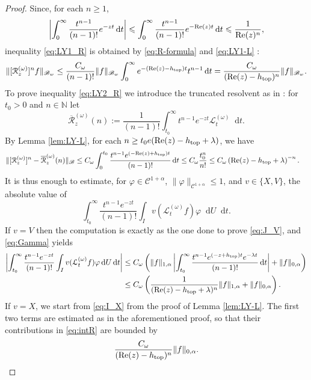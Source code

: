 \documentclass[11pt,letterpaper]{amsart}
\newcommand \cL {{\mathcal L}}
\newcommand \cR {{\mathcal R}}
\newcommand \N {{ \mathbb N}}
\newcommand \cB {{\mathscr B}}
\newcommand \cC {{\mathscr{C}}}
\newcommand*{\diff}{\mathop{}\!\mathrm{d}}
\newcommand \re {{%
\operatorname{Re}
}}
\DeclareMathOperator{\topp}{top}
\theoremstyle{definition}
\begin{document}
\begin{proof}
Since, for each $n \ge 1$,
\begin{equation}\label{eq:Gamma}
\left|\int_0^{\infty} \frac{t^{n-1}}{(n-1) !} e^{-z t} \diff t\right| \leqslant \int_0^{\infty} \frac{t^{n-1}}{(n-1) !} e^{-\re(z) t} \diff t \leqslant \frac{1}{\re(z)^{n}},
\end{equation}
inequality \eqref{eq:LY1_R} is obtained by \eqref{eq:R-formula} and \eqref{eq:LY1-L} :
\[
\|[\cR_z^{(\omega)}]^n f\|_{\cB_w} \leq \frac{C_\omega}{(n-1) !}\|f\|_{\cB_w} \int_0^{\infty}  e^{-(\re(z)-h_{\topp})t} t^{n-1}\diff t=\frac{C_\omega}{(\re(z)-h_{\topp})^n} \|f\|_{\cB_w}.
\]
To prove inequality \eqref{eq:LY2_R} we introduce the truncated resolvent as in \cite{GiLiPo}: for $t_0>0$ and $n\in \N$ let
\[
\overline\cR_z^{(\omega)}(n):=\frac{1}{(n-1) !} \int_{t_0}^{\infty} t^{n-1} e^{-z t} \mathcal{L}_t^{(\omega)}\diff t.
\]
By Lemma \ref{lem:LY-L}, for each $n \ge t_0 e (\re(z)-h_{\topp}+\lambda)$, we have
\[
\begin{split}
\|[\cR_z^{(\omega)}]^n-\overline\cR_z^{(\omega)}(n)\|_{\cB}& \leq C_\omega\int_0^{t_0} \frac{ t^{n-1} e^{(-\re(z)+h_{\topp}) t}}{(n-1) !} \diff t\leq C_\omega \frac{t_0^n}{n !} \leq C_\omega\left(\re(z)-h_{\topp}+\lambda \right)^{-n}.
\end{split}
\]
It is thus enough to estimate, for $\varphi\in \cC^{1+\alpha}$, $\|\varphi\|_{\cC^{1+\alpha}}\le 1$, and $v\in \{X,V\}$, the absolute value of
\begin{equation}\label{eq:intR}
\int_{t_0}^{\infty} \frac{ t^{n-1} e^{-z t}}{(n-1) !}\int_{I} v(\cL^{(\omega)}_tf)\varphi \diff U \diff t.
\end{equation}
If $v=V$ then the computation is exactly as the one done to prove \eqref{eq:J_V}, and \eqref{eq:Gamma} yields 
\[
\begin{split}
\left| \int_{t_0}^{\infty} \frac{ t^{n-1} e^{-z t}}{(n-1) !}\int_{I} v(\cL^{(\omega)}_tf)\varphi \diff U \diff t \right| 
%
&\le C_\omega \left( \|f\|_{1,\alpha}  \left| \int_{t_0}^{\infty} \frac{ t^{n-1} e^{(-z+h_{\topp} )t} e^{-\lambda t}}{(n-1) !} \diff t \right|+ \|f\|_{0,\alpha}\right)\\
%
& \le  C_\omega\left( \frac{1}{(\re(z)-h_{\topp}+\lambda)^{n}} \|f\|_{1,\alpha}+ \|f\|_{0,\alpha}\right) .
\end{split}
\]
If $v=X$, we start from \eqref{eq:I_X} from the proof of Lemma \ref{lem:LY-L}. The first two terms are estimated as in the aforementioned proof, so that their contributions in \eqref{eq:intR} are bounded by
\[
\frac{C_\omega}{(\re(z)-h_{\topp})^n}\|f\|_{0,\alpha}.
\]
\end{proof}
\end{document}
